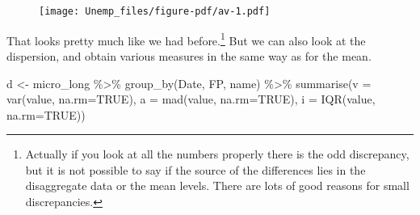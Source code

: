 \documentclass[
  letterpaper,
]{book}
\newenvironment{Shaded}{\begin{snugshade}}{\end{snugshade}}
\newcommand{\AttributeTok}[1]{\textcolor[rgb]{0.40,0.45,0.13}{#1}}
\newcommand{\ConstantTok}[1]{\textcolor[rgb]{0.56,0.35,0.01}{#1}}
\newcommand{\FunctionTok}[1]{\textcolor[rgb]{0.28,0.35,0.67}{#1}}
\newcommand{\NormalTok}[1]{\textcolor[rgb]{0.00,0.23,0.31}{#1}}
\newcommand{\OtherTok}[1]{\textcolor[rgb]{0.00,0.23,0.31}{#1}}
\newcommand{\SpecialCharTok}[1]{\textcolor[rgb]{0.37,0.37,0.37}{#1}}
\begin{document}
\begin{figure}[H]

{\centering \texttt{[image: Unemp\_files/figure-pdf/av-1.pdf]}

}

\end{figure}

That looks pretty much like we had before.\footnote{Actually if you look
  at all the numbers properly there is the odd discrepancy, but it is
  not possible to say if the source of the differences lies in the
  disaggregate data or the mean levels. There are lots of good reasons
  for small discrepancies.} But we can also look at the dispersion, and
obtain various measures in the same way as for the mean.

\begin{Shaded}
\begin{Highlighting}[]
\NormalTok{d }\OtherTok{\textless{}{-}}\NormalTok{ micro\_long }\SpecialCharTok{\%\textgreater{}\%} 
  \FunctionTok{group\_by}\NormalTok{(Date, FP, name) }\SpecialCharTok{\%\textgreater{}\%} 
  \FunctionTok{summarise}\NormalTok{(}\AttributeTok{v =} \FunctionTok{var}\NormalTok{(value, }\AttributeTok{na.rm=}\ConstantTok{TRUE}\NormalTok{), }
            \AttributeTok{a =} \FunctionTok{mad}\NormalTok{(value, }\AttributeTok{na.rm=}\ConstantTok{TRUE}\NormalTok{), }
            \AttributeTok{i =} \FunctionTok{IQR}\NormalTok{(value, }\AttributeTok{na.rm=}\ConstantTok{TRUE}\NormalTok{))}


\end{Highlighting}
\end{Shaded}
\end{document}

